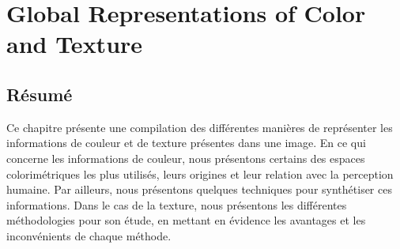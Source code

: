 %
%


\chapter{Global Representations of Color and Texture } \label{ch:color_texure_representations}

\section*{Résumé}
\noindent 
Ce chapitre présente une compilation des différentes manières de représenter les informations de couleur et de texture présentes dans une image. En ce qui concerne les informations de couleur, nous présentons certains des espaces colorimétriques les plus utilisés, leurs origines et leur relation avec la perception humaine. Par ailleurs, nous présentons quelques techniques pour synthétiser ces informations. Dans le cas de la texture, nous présentons les différentes méthodologies pour son étude, en mettant en évidence les avantages et les inconvénients de chaque méthode.
